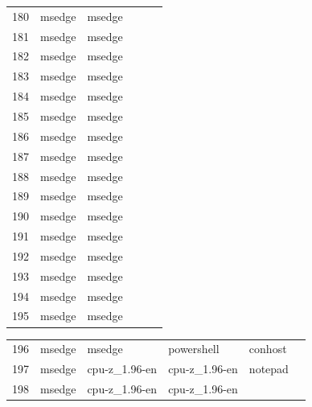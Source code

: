 \documentclass[a4paper,twoside,12pt]{book}
\begin{document}
\begin{appendices}
\begin{table}
\begin{tabular}{l|l|l|l|l|l}
		180 &  msedge &         msedge &                &                &                \\
		181 &  msedge &         msedge &                &                &                \\
		182 &  msedge &         msedge &                &                &                \\
		183 &  msedge &         msedge &                &                &                \\
		184 &  msedge &         msedge &                &                &                \\
		185 &  msedge &         msedge &                &                &                \\
		186 &  msedge &         msedge &                &                &                \\
		187 &  msedge &         msedge &                &                &                \\
		188 &  msedge &         msedge &                &                &                \\
		189 &  msedge &         msedge &                &                &                \\
		190 &  msedge &         msedge &                &                &                \\
		191 &  msedge &         msedge &                &                &                \\
		192 &  msedge &         msedge &                &                &                \\
		193 &  msedge &         msedge &                &                &                \\
		194 &  msedge &         msedge &                &                &                \\
		195 &  msedge &         msedge &                &                &                \\
		\bottomrule
	\end{tabular}		
\end{table}
\begin{table}
	\centering
	\begin{tabular}{l|l|l|l|l|l}
		\toprule
		196 &  msedge &         msedge &     powershell &        conhost &                \\
		197 &  msedge &  cpu-z\_1.96-en &  cpu-z\_1.96-en &        notepad &                \\
		198 &  msedge &  cpu-z\_1.96-en &  cpu-z\_1.96-en &                &                \\

\end{tabular}
\end{table}
\end{appendices}
\end{document}
